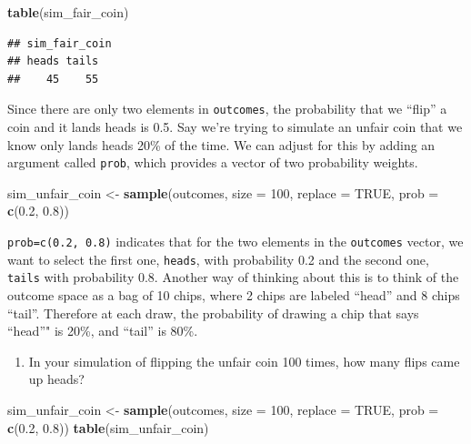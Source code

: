 \documentclass[]{article}
\newenvironment{Shaded}{\begin{snugshade}}{\end{snugshade}}
\newcommand{\KeywordTok}[1]{\textcolor[rgb]{0.13,0.29,0.53}{\textbf{{#1}}}}
\newcommand{\DataTypeTok}[1]{\textcolor[rgb]{0.13,0.29,0.53}{{#1}}}
\newcommand{\DecValTok}[1]{\textcolor[rgb]{0.00,0.00,0.81}{{#1}}}
\newcommand{\FloatTok}[1]{\textcolor[rgb]{0.00,0.00,0.81}{{#1}}}
\newcommand{\StringTok}[1]{\textcolor[rgb]{0.31,0.60,0.02}{{#1}}}
\newcommand{\OtherTok}[1]{\textcolor[rgb]{0.56,0.35,0.01}{{#1}}}
\newcommand{\NormalTok}[1]{{#1}}
\providecommand{\tightlist}{%
  \setlength{\itemsep}{0pt}\setlength{\parskip}{0pt}}
\begin{document}
\begin{Shaded}
\begin{Highlighting}[]
\KeywordTok{table}\NormalTok{(sim_fair_coin)}
\end{Highlighting}
\end{Shaded}

\begin{verbatim}
## sim_fair_coin
## heads tails 
##    45    55
\end{verbatim}

Since there are only two elements in \texttt{outcomes}, the probability
that we ``flip'' a coin and it lands heads is 0.5. Say we're trying to
simulate an unfair coin that we know only lands heads 20\% of the time.
We can adjust for this by adding an argument called \texttt{prob}, which
provides a vector of two probability weights.

\begin{Shaded}
\begin{Highlighting}[]
\NormalTok{sim_unfair_coin <-}\StringTok{ }\KeywordTok{sample}\NormalTok{(outcomes, }\DataTypeTok{size =} \DecValTok{100}\NormalTok{, }\DataTypeTok{replace =} \OtherTok{TRUE}\NormalTok{, }\DataTypeTok{prob =} \KeywordTok{c}\NormalTok{(}\FloatTok{0.2}\NormalTok{, }\FloatTok{0.8}\NormalTok{))}
\end{Highlighting}
\end{Shaded}

\texttt{prob=c(0.2,\ 0.8)} indicates that for the two elements in the
\texttt{outcomes} vector, we want to select the first one,
\texttt{heads}, with probability 0.2 and the second one, \texttt{tails}
with probability 0.8. Another way of thinking about this is to think of
the outcome space as a bag of 10 chips, where 2 chips are labeled
``head'' and 8 chips ``tail''. Therefore at each draw, the probability
of drawing a chip that says ``head''" is 20\%, and ``tail'' is 80\%.

\begin{enumerate}
\def\labelenumi{\arabic{enumi}.}
\setcounter{enumi}{2}
\tightlist
\item
  In your simulation of flipping the unfair coin 100 times, how many
  flips came up heads?
\end{enumerate}

\begin{Shaded}
\begin{Highlighting}[]
\NormalTok{sim_unfair_coin <-}\StringTok{ }\KeywordTok{sample}\NormalTok{(outcomes, }\DataTypeTok{size =} \DecValTok{100}\NormalTok{, }\DataTypeTok{replace =} \OtherTok{TRUE}\NormalTok{, }\DataTypeTok{prob =} \KeywordTok{c}\NormalTok{(}\FloatTok{0.2}\NormalTok{, }\FloatTok{0.8}\NormalTok{))}
\KeywordTok{table}\NormalTok{(sim_unfair_coin)}
\end{Highlighting}
\end{Shaded}
\end{document}
